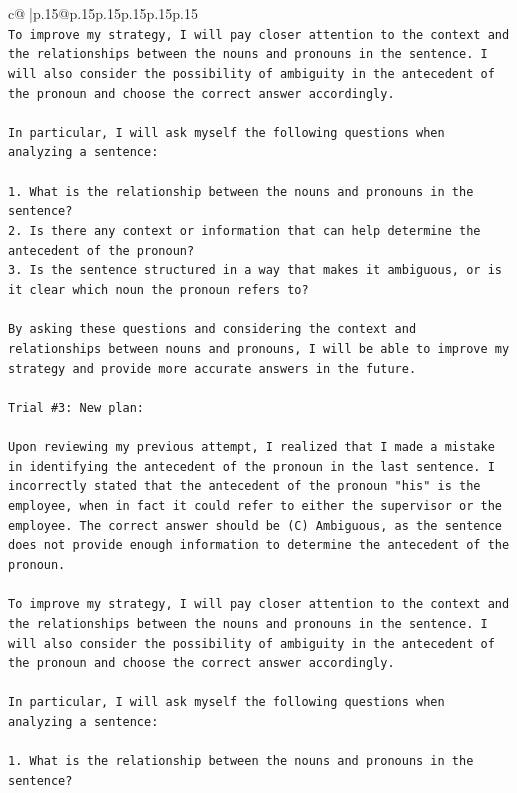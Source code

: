 \documentclass{article}
\begin{document}
{\begin{supertabular}{c@{$\;$}|p{.15\linewidth}@{}p{.15\linewidth}p{.15\linewidth}p{.15\linewidth}p{.15\linewidth}p{.15\linewidth}}
{{{\\ 
\texttt{To improve my strategy, I will pay closer attention to the context and the relationships between the nouns and pronouns in the sentence. I will also consider the possibility of ambiguity in the antecedent of the pronoun and choose the correct answer accordingly.} \\
\\ 
\texttt{In particular, I will ask myself the following questions when analyzing a sentence:} \\
\\ 
\texttt{1. What is the relationship between the nouns and pronouns in the sentence?} \\
\texttt{2. Is there any context or information that can help determine the antecedent of the pronoun?} \\
\texttt{3. Is the sentence structured in a way that makes it ambiguous, or is it clear which noun the pronoun refers to?} \\
\\ 
\texttt{By asking these questions and considering the context and relationships between nouns and pronouns, I will be able to improve my strategy and provide more accurate answers in the future.} \\
\\ 
\texttt{Trial \#3: New plan: } \\
\\ 
\texttt{Upon reviewing my previous attempt, I realized that I made a mistake in identifying the antecedent of the pronoun in the last sentence. I incorrectly stated that the antecedent of the pronoun "his" is the employee, when in fact it could refer to either the supervisor or the employee. The correct answer should be (C) Ambiguous, as the sentence does not provide enough information to determine the antecedent of the pronoun.} \\
\\ 
\texttt{To improve my strategy, I will pay closer attention to the context and the relationships between the nouns and pronouns in the sentence. I will also consider the possibility of ambiguity in the antecedent of the pronoun and choose the correct answer accordingly.} \\
\\ 
\texttt{In particular, I will ask myself the following questions when analyzing a sentence:} \\
\\ 
\texttt{1. What is the relationship between the nouns and pronouns in the sentence?} \\
}}}
\end{supertabular}}
\end{document}
